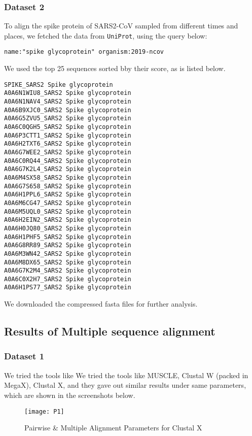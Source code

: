 \subsubsection{Dataset 2}
To align the spike protein of SARS2-CoV sampled from different times and places, 
we fetched the data from \texttt{UniProt}, using the query below:

\lstinline{name:"spike glycoprotein" organism:2019-ncov}

We used the top 25 sequences sorted bby their score, as is listed below.

\begin{lstlisting}
SPIKE_SARS2 Spike glycoprotein
A0A6N1WIU8_SARS2 Spike glycoprotein
A0A6N1NAV4_SARS2 Spike glycoprotein
A0A6B9XJC0_SARS2 Spike glycoprotein
A0A6G5ZVU5_SARS2 Spike glycoprotein
A0A6C0QGH5_SARS2 Spike glycoprotein
A0A6P3CTT1_SARS2 Spike glycoprotein
A0A6H2TXT6_SARS2 Spike glycoprotein
A0A6G7WEE2_SARS2 Spike glycoprotein
A0A6C0RQ44_SARS2 Spike glycoprotein
A0A6G7K2L4_SARS2 Spike glycoprotein
A0A6M4SX58_SARS2 Spike glycoprotein
A0A6G7S658_SARS2 Spike glycoprotein
A0A6H1PPL6_SARS2 Spike glycoprotein
A0A6M6CG47_SARS2 Spike glycoprotein
A0A6M5UQL0_SARS2 Spike glycoprotein
A0A6H2EIN2_SARS2 Spike glycoprotein
A0A6H0JQ80_SARS2 Spike glycoprotein
A0A6H1PHF5_SARS2 Spike glycoprotein
A0A6G8RR89_SARS2 Spike glycoprotein
A0A6M3WN42_SARS2 Spike glycoprotein
A0A6M8DX65_SARS2 Spike glycoprotein
A0A6G7K2M4_SARS2 Spike glycoprotein
A0A6C0X2H7_SARS2 Spike glycoprotein
A0A6H1PS77_SARS2 Spike glycoprotein
\end{lstlisting}

We downloaded the compressed fasta files for further analysis.

\subsection{Results of Multiple sequence alignment}

\subsubsection{Dataset 1}

We tried the tools like We tried the tools like MUSCLE, Clustal W (packed in MegaX), Clustal X, and they gave out similar results under same parameters, which are shown in the screenshots below. 

\begin{figure}[H]
    \centering
    \texttt{[image: P1]}
    \caption{Pairwise \& Multiple Alignment Parameters for Clustal X}
    \label{P-01}
\end{figure}

